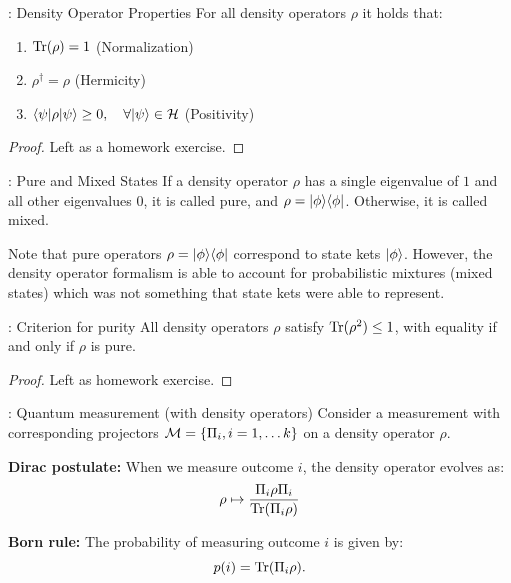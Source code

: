 \begin{propbox}{: Density Operator Properties}
    For all density operators $\rho$ it holds that:
    \begin{enumerate}
        \item $\mathrm{Tr}(\rho) = 1$ (Normalization)
        \item $\rho^\dag = \rho$ (Hermicity)
        \item $\langle \psi \rvert\rho\lvert \psi \rangle \geq 0, \quad \forall \lvert \psi \rangle \in \mathcal{H}$ (Positivity)
    \end{enumerate}
\end{propbox}
\begin{proof}
    Left as a homework exercise.
\end{proof}

\begin{defbox}{: Pure and Mixed States}
    If a density operator $\rho$ has a single eigenvalue of $1$ and all other eigenvalues $0$, it is called pure, and $\rho = \dyad{\phi}{\phi}$. Otherwise, it is called mixed.
\end{defbox}

Note that pure operators $\rho = \dyad{\phi}{\phi}$ correspond to state kets $\ket{\phi}$. However, the density operator formalism is able to account for probabilistic mixtures (mixed states) which was not something that state kets were able to represent.

\begin{propbox}{: Criterion for purity}
    All density operators $\rho$ satisfy $\mathrm{Tr}(\rho^2) \leq 1$, with equality if and only if $\rho$ is pure.
\end{propbox}

\begin{proof}
    Left as homework exercise.
\end{proof}

\begin{axiombox}{: Quantum measurement (with density operators)}
    Consider a measurement with corresponding projectors $\mathcal{M} = \set{\Pi_i, i = 1, \ldots k}$ on a density operator $\rho$. 

    \noindent
    \textbf{Dirac postulate:} When we measure outcome $i$, the density operator evolves as:
    \begin{equation}
        \rho \mapsto \frac{\Pi_i \rho \Pi_i}{\mathrm{Tr}(\Pi_i \rho)}
    \end{equation}

    \noindent \textbf{Born rule:} The probability of measuring outcome $i$ is given by:
    \begin{equation}
        p(i) = \mathrm{Tr}(\Pi_i \rho).
    \end{equation}
\end{axiombox}

